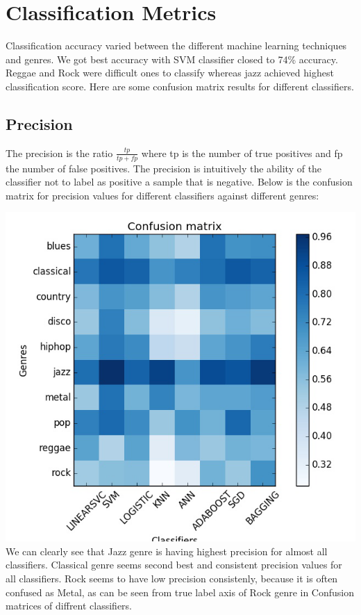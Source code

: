 \documentclass[conference]{IEEEtran}
\begin{document}
\section{Classification Metrics}
Classification accuracy varied between the different machine learning techniques and genres. We got best accuracy with SVM classifier closed to 74\% accuracy. Reggae and Rock were difficult ones to classify whereas jazz achieved highest classification score. Here are some confusion matrix results for different classifiers. 
\subsection{Precision}
The precision is the ratio $\frac{tp}{tp + fp}$ where tp is the number of true positives and fp the number of false positives. The precision is intuitively the ability of the classifier not to label as positive a sample that is negative.
Below is the confusion matrix for precision values for different classifiers against different genres:

\includegraphics[width=\columnwidth]{precision}
We can clearly see that Jazz genre is having highest precision for almost all classifiers. Classical genre seems second best and consistent precision values for all classifiers. Rock seems to have low precision consistenly, because it is often confused as Metal, as can be seen from true label axis of Rock genre in Confusion matrices of diffrent classifiers.
\end{document}
